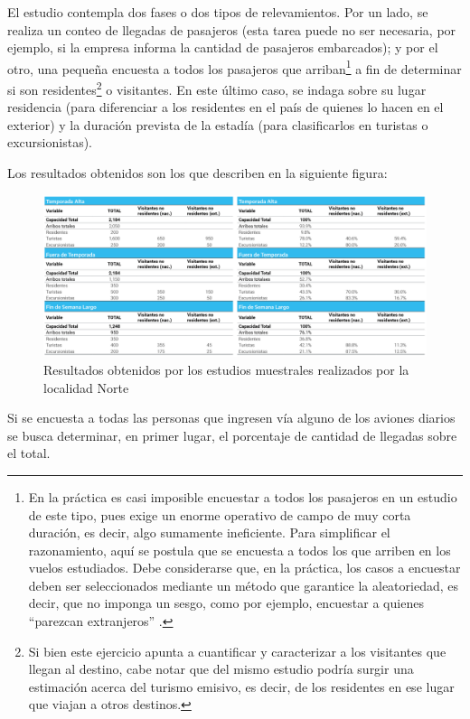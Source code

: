 \documentclass[
]{book}
\begin{document}
El estudio contempla dos fases o dos tipos de relevamientos. Por un lado, se realiza un conteo de llegadas de pasajeros (esta tarea puede no ser necesaria, por ejemplo, si la empresa informa la cantidad de pasajeros embarcados); y por el otro, una pequeña encuesta a todos los pasajeros que arriban\footnote{En la práctica es casi imposible encuestar a todos los pasajeros en un estudio de este tipo, pues exige un enorme operativo de campo de muy corta duración, es decir, algo sumamente ineficiente. Para simplificar el razonamiento, aquí se postula que se encuesta a todos los que arriben en los vuelos estudiados. Debe considerarse que, en la práctica, los casos a encuestar deben ser seleccionados mediante un método que garantice la aleatoriedad, es decir, que no imponga un sesgo, como por ejemplo, encuestar a quienes ``parezcan extranjeros'' .} a fin de determinar si son residentes\footnote{Si bien este ejercicio apunta a cuantificar y caracterizar a los visitantes que llegan al destino, cabe notar que del mismo estudio podría surgir una estimación acerca del turismo emisivo, es decir, de los residentes en ese lugar que viajan a otros destinos.} o visitantes. En este último caso, se indaga sobre su lugar residencia (para diferenciar a los residentes en el país de quienes lo hacen en el exterior) y la duración prevista de la estadía (para clasificarlos en turistas o excursionistas).

Los resultados obtenidos son los que describen en la siguiente figura:

\begin{figure}

{\centering \includegraphics[width=1\linewidth]{imagenes/figura06} 

}

\caption{Resultados obtenidos por los estudios muestrales realizados por la localidad Norte}\label{fig:resultadosobtenidos}
\end{figure}

Si se encuesta a todas las personas que ingresen vía alguno de los aviones diarios se busca determinar, en primer lugar, el porcentaje de cantidad de llegadas sobre el total.
\end{document}
